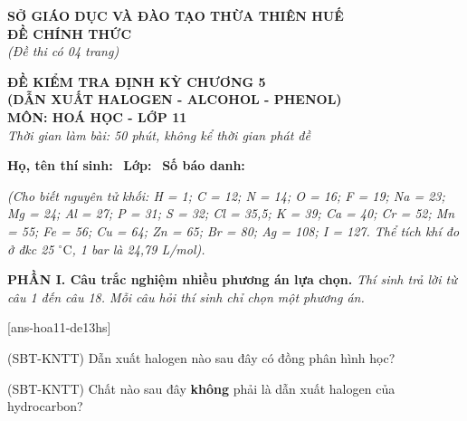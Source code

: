 \documentclass[12pt,a4paper]{article}
\begin{document}
\thispagestyle{firstpage}

\noindent
\begin{minipage}[t]{0.44\textwidth}
	\centering\fontsize{10pt}{12pt}\selectfont
	\textbf{SỞ GIÁO DỤC VÀ ĐÀO TẠO THỪA THIÊN HUẾ}\\
	\textbf{ĐỀ CHÍNH THỨC}\\
	\textit{(Đề thi có 04 trang)}
\end{minipage}\hfill
\begin{minipage}[t]{0.54\textwidth}
	\centering\fontsize{10.5pt}{13pt}\selectfont
	\textbf{ĐỀ KIỂM TRA ĐỊNH KỲ CHƯƠNG 5}\\
	\textbf{(DẪN XUẤT HALOGEN - ALCOHOL - PHENOL)}\\
	\textbf{MÔN: HOÁ HỌC - LỚP 11}\\
	\textit{Thời gian làm bài: 50 phút, không kể thời gian phát đề}
	
	\smallskip
\end{minipage}

\smallskip
\noindent\hrulefill
\smallskip

\noindent\textbf{Họ, tên thí sinh:} \dotfill\ \textbf{Lớp:} \dotfill\ \textbf{Số báo danh:} \dotfill

\smallskip
\noindent\textit{(Cho biết nguyên tử khối: H = 1; C = 12; N = 14; O = 16; F = 19; Na = 23; Mg = 24; Al = 27; P = 31; S = 32; Cl = 35,5; K = 39; Ca = 40; Cr = 52; Mn = 55; Fe = 56; Cu = 64; Zn = 65; Br = 80; Ag = 108; I = 127. Thể tích khí đo ở đkc 25 $^\circ\text{C}$, 1 bar là 24,79 L/mol).}
\smallskip

\noindent\textbf{\large PHẦN I. Câu trắc nghiệm nhiều phương án lựa chọn.}
\textit{Thí sinh trả lời từ câu 1 đến câu 18. Mỗi câu hỏi thí sinh chỉ chọn một phương án.}
\vspace{0.2cm}

[ans-hoa11-de13hs]

\begin{ex}
(SBT-KNTT) Dẫn xuất halogen nào sau đây có đồng phân hình học?
\choice
{}
{}
{\True {}}
{}
\end{ex}

\begin{ex}
(SBT-KNTT) Chất nào sau đây \textbf{không} phải là dẫn xuất halogen của hydrocarbon?
\choice
{}
{}
{\True {}}
{}
\end{ex}
\end{document}
